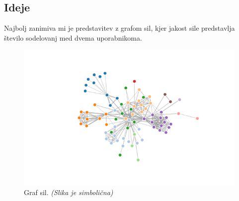 \documentclass[a4paper,11pt]{article}
\begin{document}
\subsection{Ideje}

Najbolj zanimiva mi je predstavitev z grafom sil, kjer jakost sile predstavlja število sodelovanj med dvema uporabnikoma.

\begin{figure}[htbp]
\begin{center}
\includegraphics[scale=0.3]{graf.png}
\caption{Graf sil. \textit{(Slika je simbolična)}}
\label{slika1}
\end{center}
\end{figure}
\end{document}
